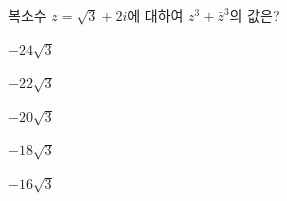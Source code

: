 복소수 $z=\sqrt{3}+2i$에 대하여 $z^3+\bar{z}^3$의 값은? 
\begin{choices32}{\rule[-3ex]{0pt}{8ex}$-24\sqrt{3}$}{\rule[-3ex]{0pt}{8ex}$-22\sqrt{3}$}{\rule[-3ex]{0pt}{8ex}$-20\sqrt{3}$}{\rule[-3ex]{0pt}{8ex}$-18\sqrt{3}$}{\rule[-3ex]{0pt}{8ex}$-16\sqrt{3}$}\end{choices32}

